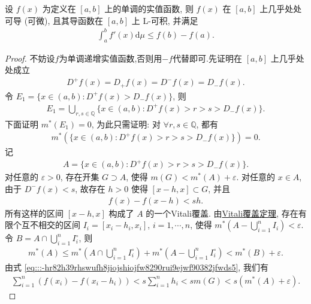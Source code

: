 \documentclass[../../main.tex]{subfiles}%
\begin{document}
\begin{theorem}\label{theorem:Lebesgue定理--实变函数}
设 $f(x)$ 为定义在 $[a,b]$ 上的单调的实值函数, 则 $f(x)$ 在 $[a,b]$ 上几乎处处可导 (可微), 且其导函数在 $[a,b]$ 上 L-可积, 并满足
\begin{align}
\int_a^b f'(x)\mathrm{d}\mu \leqslant f(b)-f(a).\label{eq:::-hr82h39rhswufh8jiojshiojfw8290rui9ejwf90382jfwds3}
\end{align}
\end{theorem}
\begin{proof}
不妨设$f$为单调递增实值函数,否则用$-f$代替即可.先证明在 $[a,b]$ 上几乎处处成立
\begin{align}
D^+f(x)=D_+f(x)=D^-f(x)=D_-f(x).\label{eq:::-hr82h39rhswufh8jiojshiojfw8290rui9ejwf90382jfwds4}
\end{align}
令 $E_1 = \{x\in(a,b): D^+f(x) > D_-f(x)\}$, 则
\begin{align*}
E_1 = \bigcup_{r,s\in\mathbb{Q}} \{x\in(a,b): D^+f(x) > r > s > D_-f(x)\}.
\end{align*}
下面证明 $m^*(E_1)=0$, 为此只需证明: 对 $\forall r,s\in\mathbb{Q}$, 都有
\begin{align*}
m^*(\{x\in(a,b): D^+f(x) > r > s > D_-f(x)\}) = 0.
\end{align*}
记
\begin{align*}
A = \{x\in(a,b): D^+f(x) > r > s > D_-f(x)\}.
\end{align*}
对任意的 $\varepsilon>0$, 存在开集 $G\supset A$, 使得 $m(G) < m^*(A)+\varepsilon$. 对任意的 $x\in A$, 由于 $D^-f(x) < s$, 故存在 $h>0$ 使得 $[x-h,x]\subset G$, 并且
\begin{align}
f(x)-f(x-h) < sh.\label{eq:::-hr82h39rhswufh8jiojshiojfw8290rui9ejwf90382jfwds5}
\end{align}
所有这样的区间 $[x-h,x]$ 构成了 $A$ 的一个Vitali覆盖. 由\hyperref[theorem:Vitali覆盖定理--实变函数]{Vitali覆盖定理}, 存在有限个互不相交的区间 $I_i = [x_i-h_i,x_i]$, $i=1,\cdots,n$, 使得 $m^*(A-\bigcup_{i=1}^n I_i) < \varepsilon$. 令 $B = A\cap\bigcup_{i=1}^n I_i^\circ$, 则
\begin{align}
m^*(A) \leqslant m^*\!\left(A\cap\bigcup_{i=1}^n I_i^\circ\right) + m^*\!\left(A-\bigcup_{i=1}^n I_i^\circ\right) < m^*(B) + \varepsilon.\label{eq:::-hr82h39rhswufh8jiojshiojfw8290rui9ejwf90382jfwds6}
\end{align}
由式 \eqref{eq:::-hr82h39rhswufh8jiojshiojfw8290rui9ejwf90382jfwds5}, 我们有
\begin{align}
\sum_{i=1}^n (f(x_i)-f(x_i-h_i)) < s\sum_{i=1}^n h_i < sm(G) < s(m^*(A)+\varepsilon).\label{eq:::-hr82h39rhswufh8jiojshiojfw8290rui9ejwf90382jfwds7}

\end{align}
\end{proof}
\end{document}
